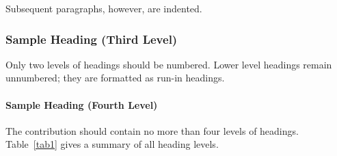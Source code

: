 \documentclass[runningheads]{llncs}
\begin{document}
Subsequent paragraphs, however, are indented.

\subsubsection{Sample Heading (Third Level)} Only two levels of
headings should be numbered. Lower level headings remain unnumbered;
they are formatted as run-in headings.

\paragraph{Sample Heading (Fourth Level)}
The contribution should contain no more than four levels of
headings. Table~\ref{tab1} gives a summary of all heading levels.



\end{document}
